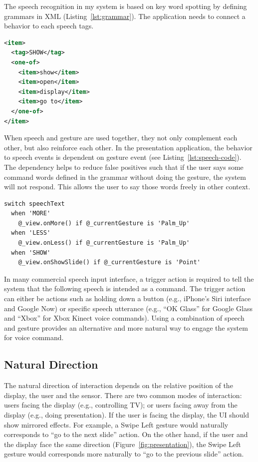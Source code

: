 The speech recognition in my system is based on key word spotting by defining
grammars in XML (Listing~\ref{lst:grammar}). The application needs to
connect a behavior to each speech tags.

\begin{lstlisting}[caption={An example of grammar definition in XML.},
language=XML, label={lst:grammar}] 
<item>
  <tag>SHOW</tag>
  <one-of>
    <item>show</item>
    <item>open</item>
    <item>display</item>
    <item>go to</item>
  </one-of>
</item>
\end{lstlisting}

When speech and gesture are used together, they not only complement each
other, but also reinforce each other. In the 
presentation application, the behavior to speech events is dependent on gesture
event (see Listing~\ref{lst:speech-code}). The dependency helps to reduce false
positives such that if the user says some command words defined in the grammar 
without doing the gesture, the system will not respond. This allows the user to
say those words freely in other context.

\begin{lstlisting}[caption={Code for speech events in CoffeeScript.},
label={lst:speech-code}] 
switch speechText
  when 'MORE'
    @_view.onMore() if @_currentGesture is 'Palm_Up'
  when 'LESS'
    @_view.onLess() if @_currentGesture is 'Palm_Up'
  when 'SHOW'
    @_view.onShowSlide() if @_currentGesture is 'Point'
\end{lstlisting}

In many commercial speech input interface, a trigger action is required to tell
the system that the following speech is intended as a command. The trigger
action can either be actions such as holding down a button (e.g., iPhone's
Siri interface and Google Now) or specific speech utterance (e.g., ``OK Glass''
for Google Glass and ``Xbox'' for Xbox Kinect voice commands). Using a
combination of speech and gesture provides an alternative and more natural way
to engage the system for voice command.

\subsection{Natural Direction}
The natural direction of interaction depends on the relative position of the
display, the user and the sensor. There are two common modes of interaction:
users facing the display (e.g., controlling TV); or users facing away from the
display (e.g., doing presentation). If the user is facing the display, the UI should show mirrored
effects.
For example, a Swipe Left gesture would naturally corresponds to ``go to the next slide'' action. On the other hand, if
the user and the display face the same direction
(Figure~\ref{fig:presentation}), the Swipe Left gesture would corresponds more
naturally to ``go to the previous slide'' action.

